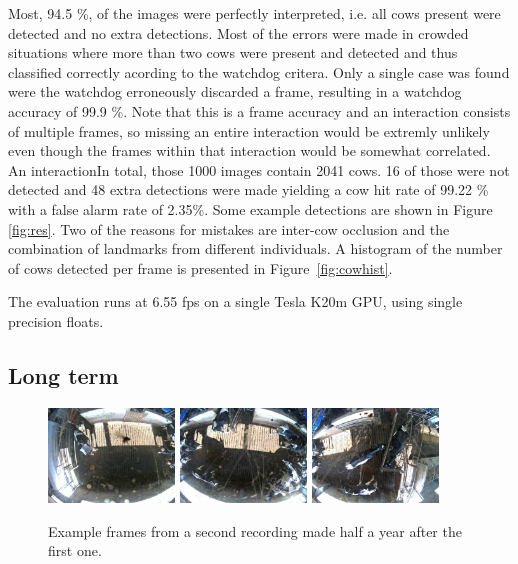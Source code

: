 \documentclass{cta-author}
\begin{document}
Most, 94.5 \%, of the images were perfectly interpreted, i.e. all cows present were detected and no extra 
detections.
Most of the errors were made in crowded situations where more than two cows were present and detected and 
thus classified correctly acording to the watchdog critera. Only a single case was found were the watchdog 
erroneously discarded a frame, resulting in a watchdog accuracy of 99.9 \%. Note that this is a frame 
accuracy and an interaction consists of multiple frames, so missing an entire interaction would be extremly 
unlikely even though the frames within that interaction would be somewhat correlated. An interactionIn total, 
those 1000 images contain 2041 cows. 16 of those were not detected and 48 extra detections were made yielding 
a cow hit rate of 99.22 \% with a false alarm rate of 2.35\%. Some example detections are shown in Figure 
\ref{fig:res}.
Two of the reasons for mistakes are inter-cow occlusion and the combination of landmarks from different 
individuals. A  
histogram of the number of cows detected per frame is presented in Figure~\ref{fig:cowhist}.

The evaluation runs at 6.55 fps on a single Tesla K20m GPU, using single precision floats.

\subsection{Long term}
\begin{figure}[tb]
\begin{center}
  \includegraphics[width=0.3\textwidth]{new-2.jpg}
  \includegraphics[width=0.3\textwidth]{new-1.jpg}
  \includegraphics[width=0.3\textwidth]{new-0.jpg}
\end{center}
  \caption{Example frames from a second recording made half a year after the first one.}
  \label{fig:new}
\end{figure}
\end{document}
